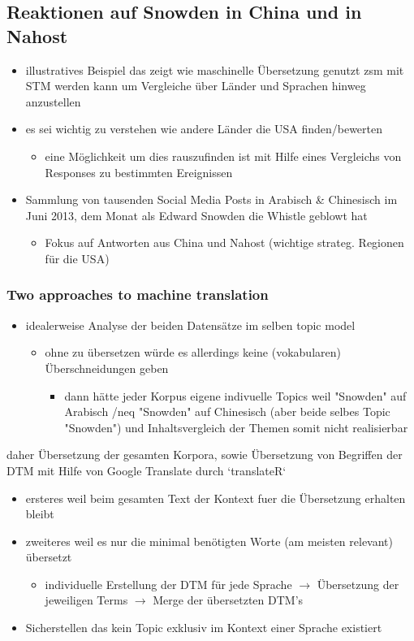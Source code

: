 \documentclass[11pt]{article}
\begin{document}
\subsection{Reaktionen auf Snowden in China und in Nahost}
\label{sec:org1e5935b}
\begin{itemize}
\item illustratives Beispiel das zeigt wie maschinelle Übersetzung genutzt zsm mit STM werden kann um Vergleiche über Länder und Sprachen hinweg anzustellen
\item es sei wichtig zu verstehen wie andere Länder die USA finden/bewerten
\begin{itemize}
\item eine Möglichkeit um dies rauszufinden ist mit Hilfe eines Vergleichs von Responses zu bestimmten Ereignissen
\end{itemize}
\item Sammlung von tausenden Social Media Posts in Arabisch \& Chinesisch im Juni 2013, dem Monat als Edward Snowden die Whistle geblowt hat
\begin{itemize}
\item Fokus auf Antworten aus China und Nahost (wichtige strateg. Regionen für die USA)
\end{itemize}
\end{itemize}
\subsubsection{Two approaches to machine translation}
\label{sec:org7b75182}
\begin{itemize}
\item idealerweise Analyse der beiden Datensätze im selben topic model
\begin{itemize}
\item ohne zu übersetzen würde es allerdings keine (vokabularen) Überschneidungen geben
\begin{itemize}
\item dann hätte jeder Korpus eigene indivuelle Topics weil "Snowden" auf Arabisch /neq "Snowden" auf Chinesisch (aber beide selbes Topic "Snowden") und Inhaltsvergleich der Themen somit nicht realisierbar
\end{itemize}
\end{itemize}
\end{itemize}

daher Übersetzung der gesamten Korpora, sowie Übersetzung von Begriffen der DTM mit Hilfe von Google Translate durch `translateR`
\begin{itemize}
\item ersteres weil beim gesamten Text der Kontext fuer die Übersetzung erhalten bleibt
\item zweiteres weil es nur die minimal benötigten Worte (am meisten relevant) übersetzt
\begin{itemize}
\item individuelle Erstellung der DTM für jede Sprache \(\rightarrow\) Übersetzung der jeweiligen Terms \(\rightarrow\) Merge der übersetzten DTM's
\end{itemize}
\item Sicherstellen das kein Topic exklusiv im Kontext einer Sprache existiert
\end{itemize}
\end{document}

